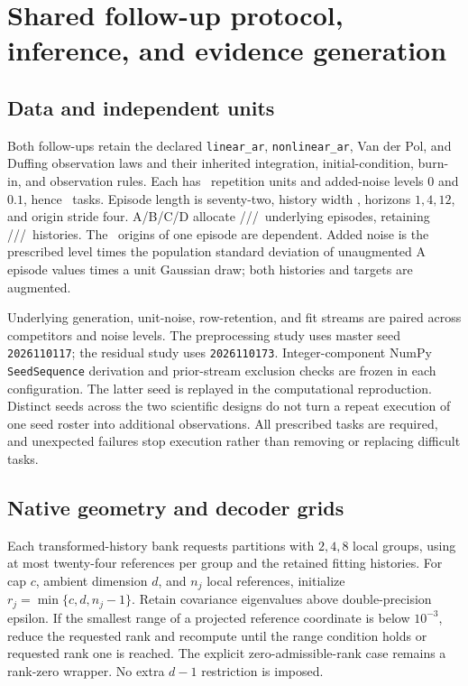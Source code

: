 \section{Shared follow-up protocol, inference, and evidence generation}
\label{app:followup-protocols}

\subsection{Data and independent units}

Both follow-ups retain the declared \texttt{linear\_ar},
\texttt{nonlinear\_ar}, Van der Pol, and Duffing observation laws and
their inherited integration, initial-condition, burn-in, and observation
rules. Each has \PPRepetitions\ repetition units and added-noise levels
$0$ and $0.1$, hence \PPTasks\ tasks. Episode length is seventy-two,
history width \PPHistory, horizons $1,4,12$, and origin stride four.
A/B/C/D allocate \PPEpisodesA/\PPEpisodesB/\PPEpisodesC/\PPEpisodesD\
underlying episodes, retaining \PPRowsA/\PPRowsB/\PPRowsC/\PPRowsD\
histories. The \PPOrigins\ origins of one episode are dependent.
Added noise is the prescribed level times the population standard
deviation of unaugmented A episode values times a unit Gaussian draw;
both histories and targets are augmented.

Underlying generation, unit-noise, row-retention, and fit streams are
paired across competitors and noise levels. The preprocessing study uses
master seed \texttt{2026110117}; the residual study uses
\texttt{2026110173}. Integer-component NumPy \texttt{SeedSequence}
derivation and prior-stream exclusion checks are frozen in each
configuration. The latter seed is replayed in the computational
reproduction. Distinct seeds across the two scientific designs do not
turn a repeat execution of one seed roster into additional observations.
All prescribed tasks are required, and unexpected failures stop execution
rather than removing or replacing difficult tasks.

\subsection{Native geometry and decoder grids}

Each transformed-history bank requests partitions with $2,4,8$ local
groups, using at most twenty-four references per group and the retained
fitting histories. For cap $c$, ambient dimension $d$, and $n_j$ local
references, initialize $r_j=\min\{c,d,n_j-1\}$. Retain covariance
eigenvalues above double-precision epsilon. If the smallest range of a
projected reference coordinate is below $10^{-3}$, reduce the requested
rank and recompute until the range condition holds or requested rank one
is reached. The explicit zero-admissible-rank case remains a rank-zero
wrapper. No extra $d-1$ restriction is imposed.

